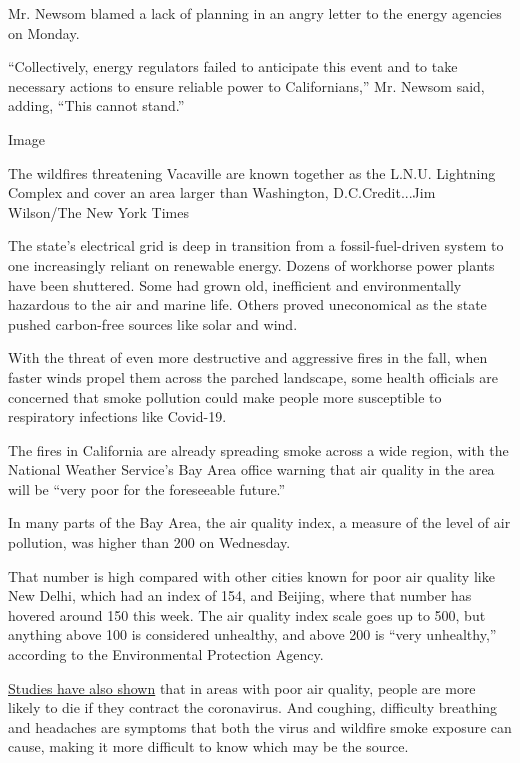 Mr. Newsom blamed a lack of planning in an angry letter to the energy
agencies on Monday.

``Collectively, energy regulators failed to anticipate this event and to
take necessary actions to ensure reliable power to Californians,'' Mr.
Newsom said, adding, ``This cannot stand.''

Image

The wildfires threatening Vacaville are known together as the L.N.U.
Lightning Complex and cover an area larger than Washington,
D.C.Credit...Jim Wilson/The New York Times

The state's electrical grid is deep in transition from a
fossil-fuel-driven system to one increasingly reliant on renewable
energy. Dozens of workhorse power plants have been shuttered. Some had
grown old, inefficient and environmentally hazardous to the air and
marine life. Others proved uneconomical as the state pushed carbon-free
sources like solar and wind.

With the threat of even more destructive and aggressive fires in the
fall, when faster winds propel them across the parched landscape, some
health officials are concerned that smoke pollution could make people
more susceptible to respiratory infections like Covid-19.

The fires in California are already spreading smoke across a wide
region, with the National Weather Service's Bay Area office warning that
air quality in the area will be ``very poor for the foreseeable
future.''

In many parts of the Bay Area, the air quality index, a measure of the
level of air pollution, was higher than 200 on Wednesday.

That number is high compared with other cities known for poor air
quality like New Delhi, which had an index of 154, and Beijing, where
that number has hovered around 150 this week. The air quality index
scale goes up to 500, but anything above 100 is considered unhealthy,
and above 200 is ``very unhealthy,'' according to the Environmental
Protection Agency.

\href{https://www.nytimes3xbfgragh.onion/2020/04/07/climate/air-pollution-coronavirus-covid.html}{Studies
have also shown} that in areas with poor air quality, people are more
likely to die if they contract the coronavirus. And coughing, difficulty
breathing and headaches are symptoms that both the virus and wildfire
smoke exposure can cause, making it more difficult to know which may be
the source.


